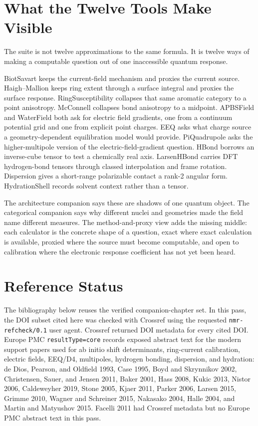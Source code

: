 \documentclass[11pt]{article}
\newcommand{\code}[1]{\texttt{#1}}
\begin{document}
\section{What the Twelve Tools Make Visible}

The suite is not twelve approximations to the same formula. It is twelve ways
of making a computable question out of one inaccessible quantum response.

BiotSavart keeps the current-field mechanism and proxies the current source.
Haigh--Mallion keeps ring extent through a surface integral and proxies the
surface response. RingSusceptibility collapses that same aromatic category to a
point anisotropy. McConnell collapses bond anisotropy to a midpoint. APBSField
and WaterField both ask for electric field gradients, one from a continuum
potential grid and one from explicit point charges. EEQ asks what charge source
a geometry-dependent equilibration model would provide. PiQuadrupole asks the
higher-multipole version of the electric-field-gradient question. HBond borrows
an inverse-cube tensor to test a chemically real axis. LarsenHBond carries DFT
hydrogen-bond tensors through classed interpolation and frame rotation.
Dispersion gives a short-range polarizable contact a rank-2 angular form.
HydrationShell records solvent context rather than a tensor.

The architecture companion says these are shadows of one quantum object. The
categorical companion says why different nuclei and geometries made the field
name different measures. The method-and-proxy view adds the missing middle:
each calculator is the concrete shape of a question, exact where exact
calculation is available, proxied where the source must become computable, and
open to calibration where the electronic response coefficient has not yet been
heard.

\section{Reference Status}

The bibliography below reuses the verified companion-chapter set. In this pass,
the DOI subset cited here was checked with Crossref using the requested
\code{nmr-refcheck/0.1} user agent. Crossref returned DOI metadata for every
cited DOI. Europe PMC \code{resultType=core} records exposed abstract text for
the modern support papers used for ab initio shift determinants, ring-current
calibration, electric fields, EEQ/D4, multipoles, hydrogen bonding,
dispersion, and hydration: de Dios, Pearson, and Oldfield 1993, Case 1995,
Boyd and Skrynnikov 2002, Christensen, Sauer, and Jensen 2011, Baker 2001,
Hass 2008, Kukic 2013, Nistor 2006,
Caldeweyher 2019, Stone 2005, Kjaer 2011, Parker 2006, Larsen 2015, Grimme
2010, Wagner and Schreiner 2015, Nakasako 2004, Halle 2004, and Martin and
Matyushov 2015. Facelli 2011 had Crossref metadata but no Europe PMC abstract
text in this pass.
\end{document}
